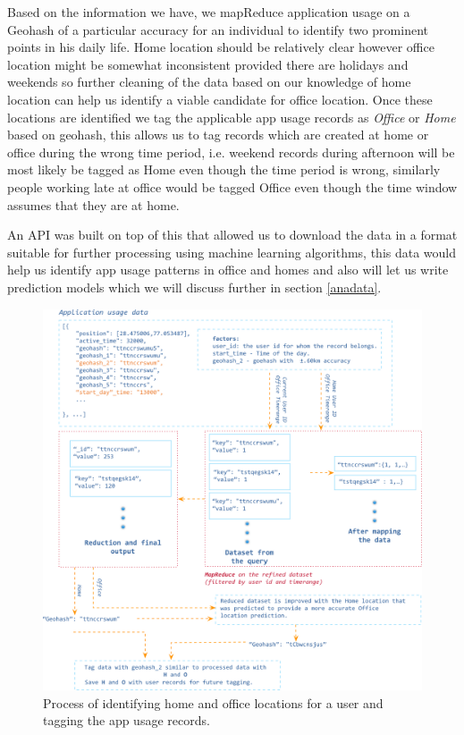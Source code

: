 \documentclass[prodmode,acmtecs]{acmsmall}
\begin{document}
Based on the information we have, we mapReduce application usage on a Geohash of a particular accuracy for an individual to identify two prominent points in his daily life. Home location should be relatively clear however office location might be somewhat inconsistent provided there are holidays and weekends so further cleaning of the data based on our knowledge of home location can help us identify a viable candidate for office location. Once these locations are identified we tag the applicable app usage records as \textit{Office} or \textit{Home} based on geohash, this allows us to tag records which are created at home or office during the wrong time period, i.e. weekend records during afternoon will be most likely be tagged as Home even though the time period is wrong, similarly people working late at office would be tagged Office even though the time window assumes that they are at home.

An API was built on top of this that allowed us to download the data in a format suitable for further processing using machine learning algorithms, this data would help us identify app usage patterns in office and homes and also will let us write prediction models which we will discuss further in section \ref{anadata}.

\begin{figure}[hbtp]
 \centering
 \includegraphics[width=120mm]{geo_home_office.png}
  \caption {Process of identifying home and office locations for a user and 
  tagging the app usage records.}
 \label{fig:HomeOffice}
\end{figure}
\end{document}
